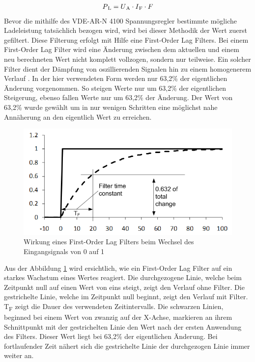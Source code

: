 \begin{align}
	P\textsubscript{L} = U\textsubscript{A} \cdot I\textsubscript{F} \cdot F \label{Main_formula3}
\end{align}
Bevor die mithilfe des VDE-AR-N 4100 Spannungsregler bestimmte mögliche Ladeleistung tatsächlich bezogen wird, wird bei dieser Methodik der Wert zuerst gefiltert. Diese Filterung erfolgt mit Hilfe eine First-Order Lag Filters. Bei einem First-Order Lag Filter wird eine Änderung zwischen dem aktuellen und einem neu berechneten Wert nicht komplett vollzogen, sondern nur teilweise. Ein solcher Filter dient der Dämpfung von oszillierenden Signalen hin zu einem homogenerem Verlauf . In der hier verwendeten Form werden nur 63,2\% der eigentlichen Änderung vorgenommen. So steigen Werte nur um 63,2\% der eigentlichen Steigerung, ebenso fallen Werte nur um 63,2\% der Änderung. Der Wert von 63,2\% wurde gewählt um in nur wenigen Schritten eine möglichst nahe Annäherung an den eigentlich Wert zu erreichen.
\begin{figure}[htb]
	\includegraphics[scale=0.75]{img/lag_Filter.png}
	\caption{Wirkung eines First-Order Lag Filters beim Wechsel des \newline Eingangsignals von 0 auf 1}
	\label{Abb_lag_filter}
\end{figure}

Aus der Abbildung \ref{Abb_lag_filter} wird ersichtlich, wie ein First-Order Lag Filter auf ein starkes Wachstum eines Wertes reagiert. Die durchgezogene Linie, welche beim Zeitpunkt null auf einen Wert von eins steigt, zeigt den Verlauf ohne Filter. Die gestrichelte Linie, welche im Zeitpunkt null beginnt, zeigt den Verlauf mit Filter. T\textsubscript{F} zeigt die Dauer des verwendeten Zeitintervalls. Die schwarzen Linien, beginned bei einem Wert von zwanzig auf der X-Achse, markieren an ihrem Schnittpunkt  mit der gestrichelten Linie den Wert nach der ersten Anwendung des Filters. Dieser Wert liegt bei 63,2\% der eigentlichen Änderung. Bei fortlaufender Zeit nähert sich die gestrichelte Linie der durchgezogen Linie immer weiter an.

